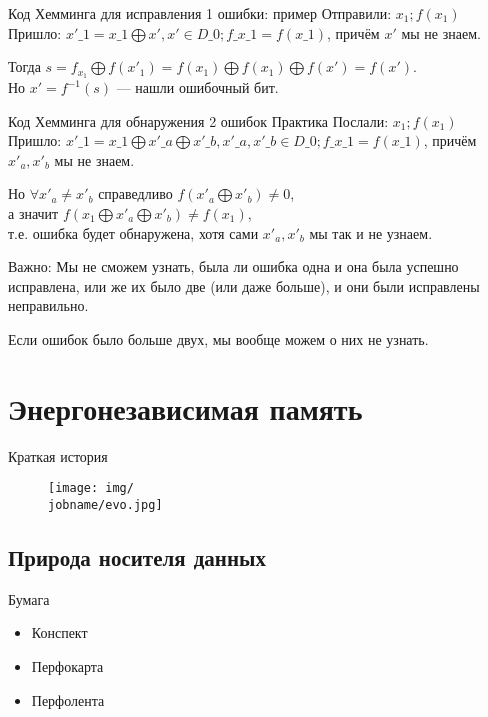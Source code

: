 \documentclass[xetex,aspectratio=43]{beamer}
\begin{document}
\begin{frame}{Код Хемминга для исправления 1 ошибки: пример}
Отправили: \(x_1; f(x_1)\)\\
Пришло: \(x'\_1 = x\_1 \bigoplus x', x' \in D\_0; f\_{x\_1} = f(x\_1)\),
причём \(x'\) мы не знаем.

Тогда
\(s = f_{x_1} \bigoplus f(x'_1) = f(x_1) \bigoplus f(x_1) \bigoplus f (x') = f(x').\)\\
Но \(x' = f^{-1}(s)\) --- нашли ошибочный бит.
\end{frame}

\begin{frame}{Код Хемминга для обнаружения 2 ошибок}
Практика Послали: \(x_1; f(x_1)\)\\
Пришло:
\(x'\_1 = x\_1 \bigoplus x'\_a \bigoplus x'\_b, x'\_a, x'\_b \in D\_0; f\_{x\_1} = f(x\_1)\),
причём \(x'_a, x'_b\) мы не знаем.

Но \(\forall x'_a \not = x'_b\) справедливо
\(f(x'_a \bigoplus x'_b) \not = 0\),\\
а значит \(f(x_1 \bigoplus x'_a \bigoplus x'_b) \neq f(x_1)\),\\
т.е. ошибка будет обнаружена, хотя сами \(x'_a, x'_b\) мы так и не
узнаем.

\pause

Важно: Мы не сможем узнать, была ли ошибка одна и она была успешно
исправлена, или же их было две (или даже больше), и они были исправлены
неправильно.

Если ошибок было больше двух, мы вообще можем о них не узнать.

\end{frame}

\section{Энергонезависимая память}

\begin{frame}{Краткая история}
    \begin{figure}
        \texttt{[image: img/\\jobname/evo.jpg]}
    \end{figure}
\end{frame}

\subsection{Природа носителя данных}

\begin{frame}{Бумага}

\begin{itemize}
\tightlist
\item
  Конспект
\item
  Перфокарта
\item
  Перфолента

\end{itemize}
\end{frame}
\end{document}
